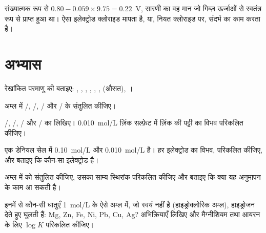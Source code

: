संख्यात्मक रूप से $0.80 - 0.059 \times 9.75 = 0.22$~V, सारणी का वह मान
जो गिब्ज़ ऊर्जाओं से स्वतंत्र रूप से प्राप्त हुआ था। ऐसा इलेक्ट्रोड
क्लोराइड मापता है, या, नियत क्लोराइड पर, संदर्भ का काम करता है।

\section{अभ्यास}

\begin{exercise}[$\star$]\label{exo:b1:nernst:1}
रेखांकित परमाणु की  बताइए: ,
, , ,
, , 
(औसत), ।
\end{exercise}

\begin{exercise}[$\star$]\label{exo:b1:nernst:2}
अम्ल में /,
/, / और / के  संतुलित कीजिए।
\end{exercise}

\begin{exercise}[$\star$]\label{exo:b1:nernst:3}
/, /,
/ और / का  लिखिए। \qty{0.010}{mol/L}
ज़िंक सल्फ़ेट में ज़िंक की पट्टी का विभव परिकलित कीजिए।
\end{exercise}

\begin{exercise}[$\star$]\label{exo:b1:nernst:4}
एक डेनियल सेल में \qty{0.10}{mol/L}  और
\qty{0.010}{mol/L}  है। हर इलेक्ट्रोड का विभव,  परिकलित कीजिए, और बताइए कि कौन-सा इलेक्ट्रोड  है।
\end{exercise}

\begin{exercise}[$\star\star$]\label{exo:b1:nernst:5}
अम्ल में  को संतुलित कीजिए, उसका साम्य स्थिरांक परिकलित कीजिए और
बताइए कि क्या यह अनुमापन के काम आ सकती है।
\end{exercise}

\begin{exercise}[$\star\star$]\label{exo:b1:nernst:6}
इनमें से कौन-सी धातुएँ \qty{1}{mol/L} के ऐसे अम्ल में, जो स्वयं
 नहीं है (हाइड्रोक्लोरिक अम्ल), हाइड्रोजन देते हुए घुलती हैं: Mg, Zn, Fe, Ni,
Pb, Cu, Ag? अभिक्रियाएँ लिखिए और मैग्नीशियम तथा आयरन के लिए
$\log K$ परिकलित कीजिए।
\end{exercise}

